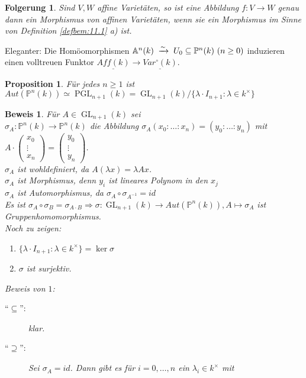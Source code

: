 \documentclass[a4paper,12pt]{report}
\theoremstyle{break}
\newtheorem{Prop}[Def]{Proposition}
\newtheorem{Folg}[Def]{Folgerung}
\theoremstyle{nonumberbreak}
\theoremstyle{nonumberplain}
\newtheorem{Bew}{Beweis}
\newcommand{\tomit}[1]{\ensuremath{\DOTSB\;\xrightarrow{#1}\;}}
\begin{document}
\begin{Folg}
  \label{folg:11.3}
  Sind $V,W$ affine Varietäten, so ist eine Abbildung $f:V\longrightarrow W$ genau dann ein
  Morphismus von affinen Varietäten, wenn sie ein Morphismus im Sinne von Definition \ref{defbem:11.1} a) ist.
\end{Folg}
Eleganter: Die Homöomorphismen $\mathbb A^n(k)\tomit{\sim}U_0\subseteq\mathbb P^n(k)\ (n\geq0)$ 
induzieren einen volltreuen Funktor $\underline{Aff(k)}\longrightarrow\underline{Var^\circ(k)}$.
 \begin{Prop}
\label{prop:11.4}
Für jedes $n \geq 1$ ist $Aut(\mathbb P^n(k)) \simeq \operatorname{PGL}_{n+1}(k) = \operatorname{GL}_{n+1}(k)/\{ \lambda \cdot I_{n+1} : \lambda \in k^\times \}$
\end{Prop}
\begin{Bew}
Für $A \in \operatorname{GL}_{n+1}(k)$ sei\\ $\sigma_A: \mathbb P^n(k) \to \mathbb{P}^n(k)$ die Abbildung $\sigma_A(x_0 : \dots : x_n) = (y_0 : \dots : y_n )$ mit $A\cdot \begin{pmatrix} x_0\\\vdots\\x_n \end{pmatrix} = \begin{pmatrix} y_0\\ \vdots \\ y_n \end{pmatrix}$.\\
$\sigma_A$ ist wohldefiniert, da $A(\lambda x) = \lambda Ax$.\\
$\sigma_A$ ist Morphismus, denn $y_i$ ist lineares Polynom in den $x_j$\\
$\sigma_A$ ist Automorphismus, da $\sigma_A \circ \sigma_{A^{-1}} = id$\\
Es ist $\sigma_A \circ \sigma_B = \sigma_{A\cdot B} \Rightarrow \sigma: \operatorname{GL}_{n+1}(k) \to Aut(\mathbb P^n(k)), A\mapsto \sigma_A$ ist Gruppenhomomorphismus.\\
Noch zu zeigen:
\begin{enumerate}[label=\arabic{*}.]
\item $\{ \lambda \cdot I_{n+1} : \lambda \in k^\times \} = \ker{\sigma}$
\item $\sigma$ ist surjektiv.
\end{enumerate}
Beweis von $1$:
\begin{description}
\item ["`$\subseteq$"':] klar.
\item ["`$\supseteq$"':] Sei $\sigma_A = id$. Dann gibt es für $i = 0, \dots, n$ ein $\lambda_i \in k^\times$ mit

\end{description}
\end{Bew}
\end{document}
